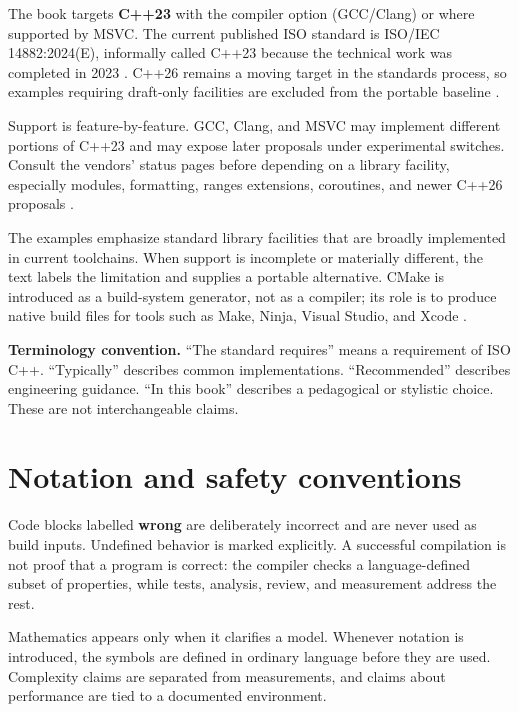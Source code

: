 The book targets \textbf{C++23} with the compiler option  (GCC/Clang) or  where supported by MSVC. The current published ISO standard is ISO/IEC 14882:2024(E), informally called C++23 because the technical work was completed in 2023 \citep{ISO2024,isocpp-standard}. C++26 remains a moving target in the standards process, so examples requiring draft-only facilities are excluded from the portable baseline \citep{isocpp-status}.

Support is feature-by-feature. GCC, Clang, and MSVC may implement different portions of C++23 and may expose later proposals under experimental switches. Consult the vendors' status pages before depending on a library facility, especially modules, formatting, ranges extensions, coroutines, and newer C++26 proposals \citep{gcc-status,clang-status,msvc-conformance}.

The examples emphasize standard library facilities that are broadly implemented in current toolchains. When support is incomplete or materially different, the text labels the limitation and supplies a portable alternative. CMake is introduced as a build-system generator, not as a compiler; its role is to produce native build files for tools such as Make, Ninja, Visual Studio, and Xcode \citep{cmake-docs}.

\begin{note}
\textbf{Terminology convention.} “The standard requires” means a requirement of ISO C++. “Typically” describes common implementations. “Recommended” describes engineering guidance. “In this book” describes a pedagogical or stylistic choice. These are not interchangeable claims.
\end{note}

\chapter*{Notation and safety conventions}

Code blocks labelled \textbf{wrong} are deliberately incorrect and are never used as build inputs. Undefined behavior is marked explicitly. A successful compilation is not proof that a program is correct: the compiler checks a language-defined subset of properties, while tests, analysis, review, and measurement address the rest.

Mathematics appears only when it clarifies a model. Whenever notation is introduced, the symbols are defined in ordinary language before they are used. Complexity claims are separated from measurements, and claims about performance are tied to a documented environment.

